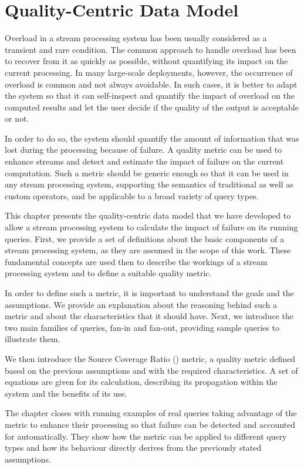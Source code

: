 \chapter{Quality-Centric Data Model}
\label{ch:data_model}

Overload in a stream processing system has been usually considered as a transient and rare condition. The
common approach to handle overload has been to recover from it as quickly as possible, without
quantifying its impact on the current processing. In many large-scale deployments, however, the
occurrence of overload is common and not always avoidable. In such cases, it is better to adapt the
system so that it can self-inspect and quantify the impact of overload on the computed results and let
the user decide if the quality of the output is acceptable or not. 

In order to do so, the system should quantify the amount of information that was lost during the
processing because of failure. A quality metric can be used to enhance streams and detect and
estimate the impact of failure on the current computation. Such a metric should be generic enough so
that it can be used in any stream processing system, supporting the semantics of traditional as well as
custom operators, and be applicable to a broad variety of query types.
 
This chapter presents the quality-centric data model that we have
developed to allow a stream processing system to calculate the impact of failure on its running queries.
First, we provide a set of definitions about the basic components of a stream processing
system, as they are assumed in the scope of this work. These fundamental concepts are used then to
describe the workings of a stream processing system and to define a suitable quality metric.

In order to define such a metric, it is important to understand the goals and the assumptions.
We provide an explanation about the reasoning behind such a metric and about the characteristics
that it should have. Next, we introduce the two main families of queries, fan-in and
fan-out, providing sample queries to illustrate them.

We then introduce the Source Coverage Ratio (\sic) metric, a quality metric
defined based on the previous assumptions and with the required characteristics. A set of equations are
given for its calculation, describing its propagation within the system and the benefits of its use.

The chapter closes with running examples of real queries taking advantage of the \sic metric to
enhance their processing so that failure can be detected and accounted for automatically. They show
how the \sic metric can be applied to different query types and how its behaviour directly derives from
the previously stated assumptions.

